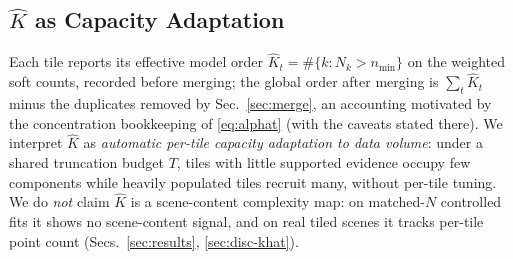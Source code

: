 \subsection{$\hat{K}$ as Capacity Adaptation}
\label{sec:khat}

 Each tile reports its effective model order
$\hat{K}_t = \#\{k : N_k > n_{\min}\}$ on the weighted soft counts,
recorded before merging; the global order after merging is
$\sum_t \hat{K}_t$ minus the duplicates removed by
Sec.~\ref{sec:merge}, an accounting motivated by the concentration
bookkeeping of \eqref{eq:alphat} (with the caveats stated there). We interpret $\hat{K}$ as
\emph{automatic per-tile capacity adaptation to data volume}: under a
shared truncation budget $T$, tiles with little supported evidence occupy
few components while heavily populated tiles recruit many, without
per-tile tuning. We do \emph{not} claim $\hat{K}$ is a
scene-content complexity map: on matched-$N$ controlled fits it shows
no scene-content signal, and on real tiled scenes it tracks per-tile
point count (Secs.~\ref{sec:results}, \ref{sec:disc-khat}).
